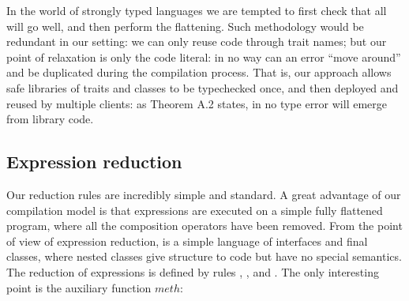 %
%
%
%



\noindent 
In the world of strongly typed languages we are tempted to
first check that all will go well, and then perform the flattening. 
Such methodology would be redundant in our setting: we can only reuse code through trait names; but our point of relaxation is only the code literal: in no way can an error ``move around'' and be duplicated during the compilation process.
That is, our approach allows safe libraries of traits and classes to be typechecked once, and then deployed and reused by multiple clients: as Theorem A.2 states, in \name no type error will emerge from library code.


\saveSpace
\subsection{Expression reduction}
\saveSpace
Our reduction rules are incredibly simple and standard.
A great advantage of our compilation model is that expressions are executed on
a simple fully flattened program, 
where all the composition operators have been removed.
From the point of view of expression reduction, \name is a simple language of 
interfaces and final classes, where nested classes give structure to code but have no special semantics.
The reduction of expressions is defined by rules
, , and .
The only interesting point is the auxiliary function $\mathit{meth}$:


